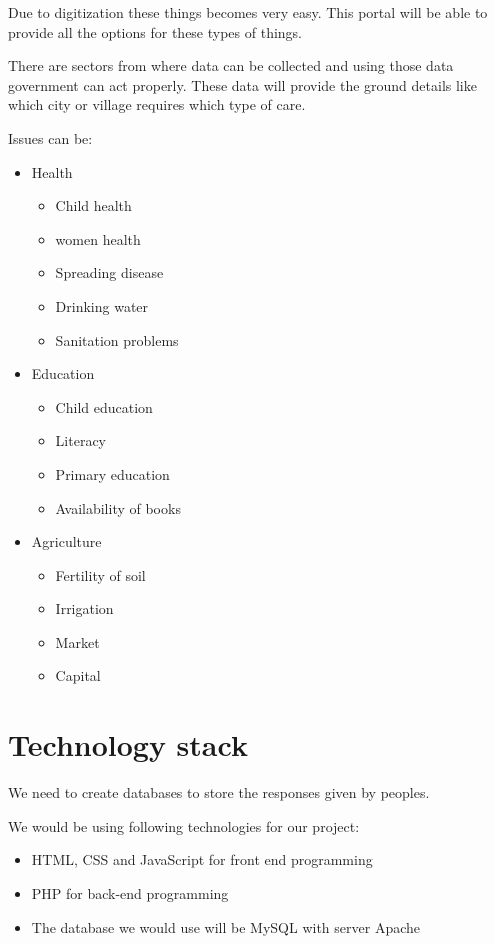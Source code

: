 \documentclass[journal]{IEEEtran}
\begin{document}
Due to digitization these things becomes very easy. This portal will be able to provide all the options for these types of things.

There are sectors from where data can be collected and using those data government can act properly. These data will provide the ground details like which city or village requires which type of care. 

Issues can be:

\begin{itemize}
\item Health
\begin{itemize}
    \item Child health
    \item women health
    \item Spreading disease
    \item Drinking water
    \item Sanitation problems
\end{itemize}

\item Education
\begin{itemize}
    \item Child education
    \item Literacy
    \item Primary education
    \item Availability of books
\end{itemize}

\item Agriculture
\begin{itemize}
    \item Fertility of soil
    \item Irrigation
    \item Market
    \item Capital
\end{itemize}
\end{itemize}

\section{Technology stack}
We need to create databases to store the responses given by peoples.

We would be using following technologies for our project:
\begin{itemize}
\item  HTML, CSS and JavaScript for front end programming 
\item  PHP for back-end programming
\item  The database we would use will be MySQL with server Apache 
\end{itemize}
\end{document}
